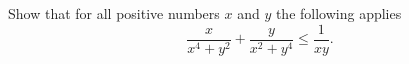 Show that for all positive numbers $x$ and $y$ the following applies
$$\frac{x}{x^4+y^2}+\frac{y}{x^2+y^4} \leq \frac{1}{xy}.$$